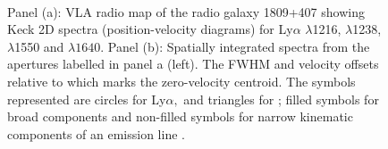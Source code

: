 \begin{figure}[!ht]
 \centering
 \\
     \caption[Keck 2D and 1D spectra from \citet{villar-martin2003}]{Panel (a): VLA radio map of the radio galaxy 1809+407 showing Keck 2D spectra (position-velocity diagrams) for Ly$\alpha$ $\lambda$1216,  $\lambda$1238,  $\lambda$1550 and  $\lambda1640.$ Panel (b): Spatially integrated spectra from the apertures labelled in panel a (left). The FWHM and velocity offsets relative to  which marks the zero-velocity centroid. The symbols represented are circles for Ly$\alpha,$ and triangles for ; filled symbols for broad components and non-filled symbols for narrow kinematic components of an emission line \citep{villar-martin2003}.} 
 \label{fig:kinematics-ionised-Villar_Martin2003}
\end{figure}

